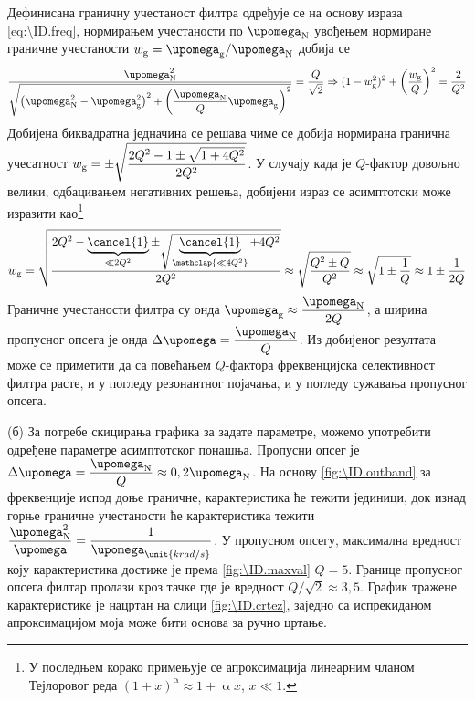 Дефинисана граничну учестаност филтра одређује се на основу израза \ref{eq:\ID.freq}, нормирањем учестаности 
по $\upomega_{\rm N}$ увођењем нормиране граничне учестаности $w_{\rm g} = \upomega_{\rm g}/\upomega_{\rm N}$ добија се 
\begin{equation}
    \dfrac{\upomega_{\rm N}^2}{\sqrt{  
        \left(\upomega_{\rm N}^2 - \upomega_{\rm g}^2\right)^2 
        +
        \left(
            \dfrac{\upomega_{\rm N}}{Q} \upomega_{\rm g}
        \right)^2
    }} = \dfrac{Q}{\sqrt2} 
    \Rightarrow
    (1 - w_{\rm g}^2)^2 + \left( \dfrac{w_{\rm g}}{Q} \right)^2 = \dfrac{2}{Q^2}
\end{equation}
Добијена биквадратна једначина се решава чиме се добија нормирана гранична учесатност
$
    w_{\rm g} = \pm \sqrt{ \dfrac{2Q^2 - 1 \pm \sqrt{1 + 4Q^2}}{2Q^2}  }
$. 
У случају када је $Q$-фактор довољно велики, одбацивањем негативних решења, добијени израз
 се асимптотски може изразити као\footnote{У последњем корако примењује се апроксимација линеарним чланом Тејлоровог реда
 $(1 + x)^\upalpha \approx 1 + \upalpha x$, $x \ll 1$. }
\begin{equation}
    w_{\rm g} = \sqrt{ \dfrac{2Q^2 - \underbrace{\cancel{1}}_{\ll 2Q^2} \pm \sqrt{\underbrace{\cancel{1}}_{\mathclap{\ll 4Q^2}} + 4Q^2}}{2Q^2}  }
    \approx 
    \sqrt{
        \dfrac{Q^2 \pm Q}{Q^2}
    }
    \approx
    \sqrt{1 \pm \dfrac{1}{Q}} \approx 1 \pm \dfrac{1}{2Q}
\end{equation}
Граничне учестаности филтра су онда $\upomega_{\rm g} \approx \dfrac{\upomega_{\rm N}}{2Q}$, а ширина пропусног опсега је онда 
$\Delta \upomega = \dfrac{\upomega_{\rm N}}{Q}$. Из добијеног резултата може се приметити да са повећањем 
$Q$-фактора фреквенцијска селективност филтра расте, и у погледу резонантног појачања, и у погледу сужавања пропусног 
опсега.

(б) За потребе скицирања графика за задате параметре, можемо употребити одређене параметре асимптотског понашња. 
Пропусни опсег је $\Delta \upomega = \dfrac{\upomega_{\rm N}}{Q} \approx 0,2 \upomega_{\rm N}$.
На основу \eqref{fig:\ID.outband} за фреквенције испод доње граничне, карактеристика ће тежити јединици, док изнад 
горње граничне учестаности ће карактеристика тежити $\dfrac{\upomega_{\rm N}^2}{\upomega} 
= \dfrac{1}{\upomega_{\unit{krad/s}}}$. У пропусном опсегу, максимална вредност коју карактеристика достиже је 
према \eqref{fig:\ID.maxval} $Q = 5$. Границе пропусног опсега филтар пролази кроз тачке где је вредност 
$Q/\sqrt 2 \approx 3,5$.
График тражене карактеристике је нацртан на слици \ref{fig:\ID.crtez},
заједно са испрекиданом апроксимацијом моја може бити основа за ручно цртање. 


